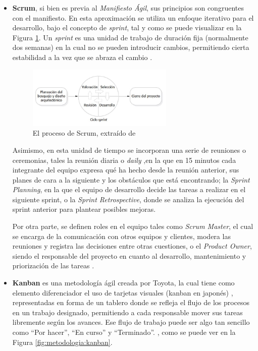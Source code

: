         \begin{itemize}
            \item \textbf{Scrum}, si bien es previa al \textit{Manifiesto Ágil}, sus principios son congruentes con el manifiesto. En esta aproximación se utiliza un enfoque iterativo para el desarrollo, bajo el concepto de \textit{sprint}, tal y como se puede visualizar en la Figura \ref{fig:metodologia:scrum}. Un \textit{sprint} es una unidad de trabajo de duración fija (normalmente dos semanas) en la cual no se pueden introducir cambios, permitiendo cierta estabilidad a la vez que se abraza el cambio \cite{pressman_software_2005}. 
    
            \begin{figure}[h]
                \centering
                \includegraphics[width=0.66\textwidth]{figures/scrum.JPG}
                \caption[El proceso de Scrum]{El proceso de Scrum, extraído de \cite{sommerville_software_2011}}
                \label{fig:metodologia:scrum}
            \end{figure}
            
            Asimismo, en esta unidad de tiempo se incorporan una serie de reuniones o ceremonias, tales la reunión diaria o \textit{daily} ,en la que en 15 minutos cada integrante del equipo expresa qué ha hecho desde la reunión anterior, sus planes de cara a la siguiente y los obstáculos que está encontrando; la \textit{Sprint Planning}, en la que el equipo de desarrollo decide las tareas a realizar en el siguiente sprint, o la \textit{Sprint Retrospective}, donde se analiza la ejecución del sprint anterior para plantear posibles mejoras. 
    
            Por otra parte, se definen roles en el equipo tales como \textit{Scrum Master}, el cual se encarga de la comunicación con otros equipos y clientes, modera las reuniones y registra las decisiones entre otras cuestiones, o el \textit{Product Owner}, siendo el responsable del proyecto en cuanto al desarrollo, mantenimiento y priorización de las tareas \cite{valtx_metodologias_2023}.
    
            \item \textbf{Kanban} es una metodología ágil creada por Toyota, la cual tiene como elemento diferenciador el uso de tarjetas visuales (kanban en japonés) \cite{pzt_metodologias_nodate}, representadas en forma de un tablero donde se refleja el flujo de los procesos en un trabajo designado, permitiendo a cada responsable mover sus tareas libremente según los avances. Ese flujo de trabajo puede ser algo tan sencillo como ``Por hacer'', ``En curso'' y  ``Terminado''.
            \cite{atlassian_que_nodate-1}, como se puede ver en la Figura \ref{fig:metodologia:kanban}.
    

\end{itemize}
